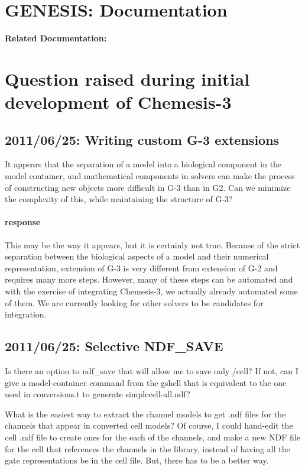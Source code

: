\documentclass[12pt]{article}
\begin{document}
\section*{GENESIS: Documentation}

{\bf Related Documentation:}

\section*{Question raised during initial development of Chemesis-3}

\subsection{2011/06/25: Writing custom G-3 extensions}

It appears that the separation of a model into a biological component
in the model container, and mathematical components in solvers can
make the process of constructing new objects more difficult in G-3
than in G2. Can we minimize the complexity of this, while maintaining
the structure of G-3?

\paragraph{response} This may be the way it appears, but it is
certainly not true.  Because of the strict separation between the
biological aspects of a model and their numerical representation,
extension of G-3 is very different from extension of G-2 and requires
many more steps.  However, many of these steps can be automated and
with the exercise of integrating Chemesis-3, we actually already
automated some of them.  We are currently looking for other solvers to
be candidates for integration.


\subsection{2011/06/25: Selective NDF\_SAVE}

Is there an option to ndf\_save that will allow me to save only /cell?
If not, can I give a model-container command from the gshell that is
equivalent to the one used in conversions.t to generate
simplecell-all.ndf?

What is the easiest way to extract the channel models to get .ndf
files for the channels that appear in converted cell models?  Of
course, I could hand-edit the cell .ndf file to create ones for the
each of the channels, and make a new NDF file for the cell that
references the channels in the library, instead of having all the gate
representations be in the cell file.  But, there has to be a better
way.
\end{document}
